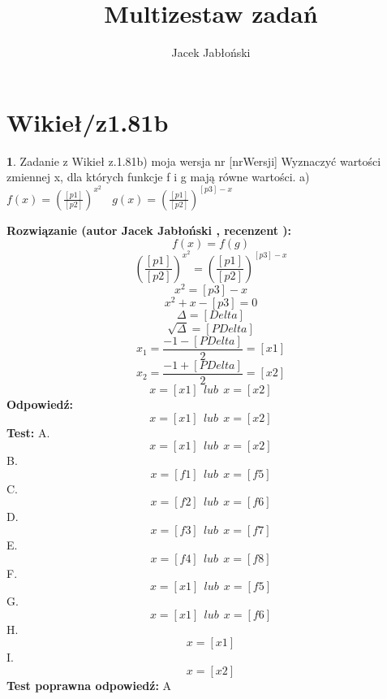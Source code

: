 \documentclass[12pt, a4paper]{article}
\title{Multizestaw zadań}
\author{Jacek Jabłoński}
\date{}
\theoremstyle{definition} %
\newtheorem{zad}{}
\newcommand{\kategoria}[1]{\section{#1}} %
\newcommand{\zadStart}[1]{\begin{zad}#1\newline} %
\newcommand{\zadStop}{\end{zad}}   %
\newcommand{\rozwStart}[2]{\noindent \textbf{Rozwiązanie (autor #1 , recenzent #2): }\newline} %
\newcommand{\rozwStop}{\newline}                                            %
\newcommand{\odpStart}{\noindent \textbf{Odpowiedź:}\newline}    %
\newcommand{\odpStop}{\newline}                                             %
\newcommand{\testStart}{\noindent \textbf{Test:}\newline} %
\newcommand{\testStop}{\newline} %
\newcommand{\kluczStart}{\noindent \textbf{Test poprawna odpowiedź:}\newline} %
\newcommand{\kluczStop}{\newline} %
\begin{document}
\maketitle


\kategoria{Wikieł/z1.81b}
\zadStart{Zadanie z Wikieł z.1.81b) moja wersja nr [nrWersji]}
Wyznaczyć wartości zmiennej x, dla których funkcje f i g mają równe wartości.
a)$f(x)=(\frac{[p1]}{[p2]})^{x^2} \ \ \ \ g(x)=(\frac{[p1]}{[p2]})^{[p3]-x}$
\zadStop
\rozwStart{Jacek Jabłoński}{}
$$f(x)=f(g)$$
$$(\frac{[p1]}{[p2]})^{x^2} = (\frac{[p1]}{[p2]})^{[p3]-x}$$
$$x^2 = [p3]-x$$
$$x^2 + x - [p3] = 0$$
$$\Delta = [Delta] $$
$$\sqrt{\Delta} = [PDelta] $$
$$x_1 = \frac{-1-[PDelta]}{2} = [x1] $$
$$x_2 = \frac{-1+[PDelta]}{2} = [x2] $$
$$x = [x1] \ \ lub \ \ x = [x2]$$
\rozwStop
\odpStart
$$x = [x1] \ \ lub \ \ x = [x2]$$
\odpStop
\testStart
A. $$x = [x1] \ \ lub \ \ x = [x2]$$
B. $$x = [f1] \ \ lub \ \ x = [f5]$$
C. $$x = [f2] \ \ lub \ \ x = [f6]$$
D. $$x = [f3] \ \ lub \ \ x = [f7]$$
E. $$x = [f4] \ \ lub \ \ x = [f8]$$
F. $$x = [x1] \ \ lub \ \ x = [f5]$$
G. $$x = [x1] \ \ lub \ \ x = [f6]$$
H. $$x = [x1]$$
I. $$x = [x2]$$
\testStop
\kluczStart
A
\kluczStop
\end{document}
